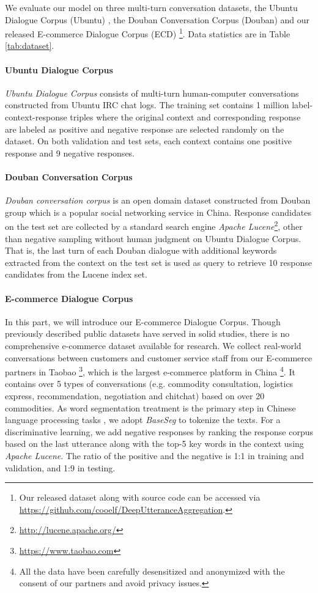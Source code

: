 \documentclass[11pt]{article}
\begin{document}
We evaluate our model on three multi-turn conversation datasets, the Ubuntu Dialogue Corpus (Ubuntu) \cite{Lowe2015The}, the Douban Conversation Corpus (Douban) \cite{Wu2016Sequential} and our released E-commerce Dialogue Corpus (ECD) \footnote{Our released dataset  along with source code can be accessed via \url{https://github.com/cooelf/DeepUtteranceAggregation}.}. Data statistics are in Table \ref{tab:dataset}. 

\paragraph{Ubuntu Dialogue Corpus}
\emph{Ubuntu Dialogue Corpus} consists of multi-turn human-computer conversations constructed from Ubuntu IRC chat logs. The training set contains 1 million label-context-response triples where the original context and corresponding response are labeled as positive and negative response are selected randomly on the dataset. On both validation and test sets, each context contains one positive response and 9 negative responses. 
\paragraph{Douban Conversation Corpus}
\emph{Douban conversation corpus} is an open domain dataset constructed from Douban group which is a popular social networking service in China. Response candidates on the test set are collected by a standard search engine \emph{Apache Lucene}\footnote{\url{http://lucene.apache.org/}}, other than negative sampling without human judgment on Ubuntu Dialogue Corpus. That is, the last turn of each Douban dialogue with additional keywords extracted from the context on the test set is used as query to retrieve 10 response candidates from the Lucene index set. 

\paragraph{E-commerce Dialogue Corpus} In this part, we will introduce our E-commerce Dialogue Corpus. Though previously described public datasets have served in solid studies, there is no comprehensive e-commerce dataset available for research. We collect real-world conversations between customers and customer service staff from our E-commerce partners in Taobao \footnote{\url{https://www.taobao.com}}, which is the largest e-commerce platform in China \footnote{All the data have been carefully desensitized and anonymized with the consent of our partners and avoid privacy issues.}. It contains over 5 types of conversations (e.g. commodity consultation, logistics express, recommendation, negotiation and chitchat) based on over 20 commodities. As word segmentation treatment is the primary step in Chinese language processing tasks \cite{Zhao2007A,Cai2017Fast,Cai2016Neural}, we adopt \emph{BaseSeg} \cite{Hai2006An} to tokenize the texts. For a discriminative learning, we add negative responses by ranking the response corpus based on the last utterance along with the top-5 key words in the context using \emph{Apache Lucene}. The ratio of the positive and the negative is 1:1 in training and validation, and 1:9 in testing. 
\end{document}

